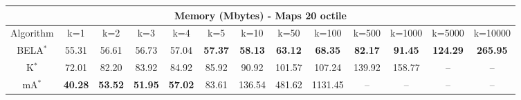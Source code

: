 \begin{tabular}{c|cccccccccccc}\toprule
\multicolumn{13}{c}{Memory (Mbytes) - Maps 20 octile}\\ \midrule
Algorithm & k=1 & k=2 & k=3 & k=4 & k=5 & k=10 & k=50 & k=100 & k=500 & k=1000 & k=5000 & k=10000 \\ \midrule
BELA$^*$ & 55.31 & 56.61 & 56.73 & 57.04 & \textbf{57.37} & \textbf{58.13} & \textbf{63.12} & \textbf{68.35} & \textbf{82.17} & \textbf{91.45} & \textbf{124.29} & \textbf{265.95} \\
K$^*$ & 72.01 & 82.20 & 83.92 & 84.92 & 85.92 & 90.92 & 101.57 & 107.24 & 139.92 & 158.77 & -- & -- \\
mA$^*$ & \textbf{40.28} & \textbf{53.52} & \textbf{51.95} & \textbf{57.02} & 83.61 & 136.54 & 481.62 & 1131.45 & -- & -- & -- & -- \\ \bottomrule 
\end{tabular}

